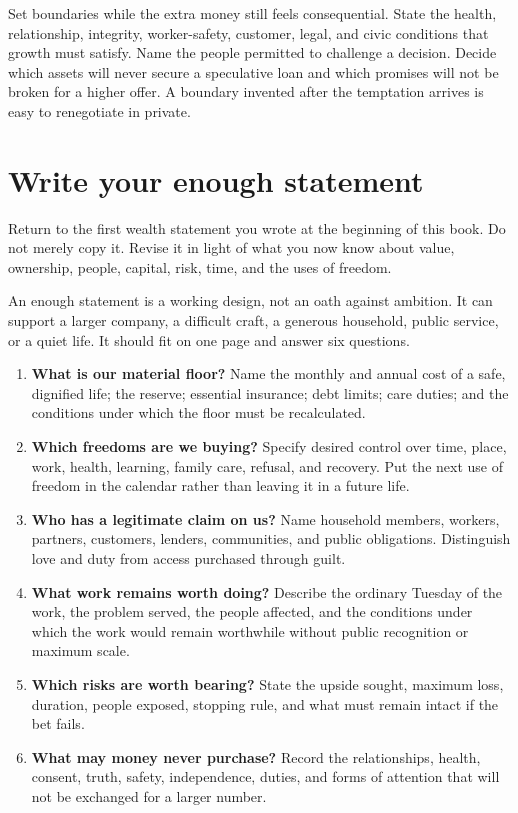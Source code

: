 Set boundaries while the extra money still feels consequential. State the
health, relationship, integrity, worker-safety, customer, legal, and civic
conditions that growth must satisfy. Name the people permitted to challenge a
decision. Decide which assets will never secure a speculative loan and which
promises will not be broken for a higher offer. A boundary invented after the
temptation arrives is easy to renegotiate in private.

\section{Write your enough statement}

Return to the first wealth statement you wrote at the beginning of this book.
Do not merely copy it. Revise it in light of what you now know about value,
ownership, people, capital, risk, time, and the uses of freedom.

An enough statement is a working design, not an oath against ambition. It can
support a larger company, a difficult craft, a generous household, public
service, or a quiet life. It should fit on one page and answer six questions.

\begin{enumerate}[itemsep=0.22em]
\item \textbf{What is our material floor?} Name the monthly and annual cost of
  a safe, dignified life; the reserve; essential insurance; debt limits; care
  duties; and the conditions under which the floor must be recalculated.
\item \textbf{Which freedoms are we buying?} Specify desired control over
  time, place, work, health, learning, family care, refusal, and recovery.
  Put the next use of freedom in the calendar rather than leaving it in a
  future life.
\item \textbf{Who has a legitimate claim on us?} Name household members,
  workers, partners, customers, lenders, communities, and public obligations.
  Distinguish love and duty from access purchased through guilt.
\item \textbf{What work remains worth doing?} Describe the ordinary Tuesday
  of the work, the problem served, the people affected, and the conditions
  under which the work would remain worthwhile without public recognition or
  maximum scale.
\item \textbf{Which risks are worth bearing?} State the upside sought, maximum
  loss, duration, people exposed, stopping rule, and what must remain intact if
  the bet fails.
\item \textbf{What may money never purchase?} Record the relationships,
  health, consent, truth, safety, independence, duties, and forms of attention
  that will not be exchanged for a larger number.
\end{enumerate}

